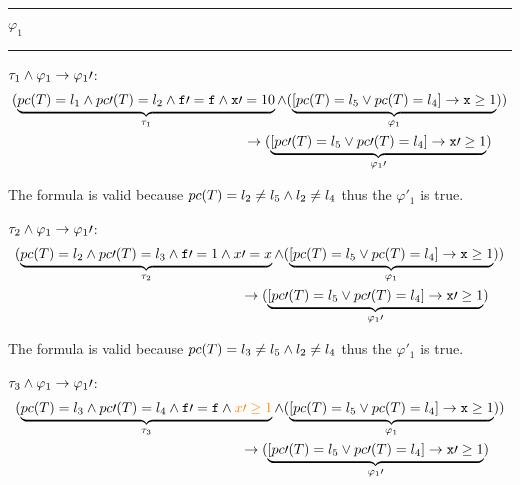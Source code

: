 \begin{center}\rule{4cm}{0.4pt}  $\varphi_1$  \rule{4cm}{0.4pt}\end{center}
	
	 $\tau_1 \wedge \varphi_1 \to \varphi_1\prime $:
	\begin{align*}
		(
			\underbrace{pc(T) = l_1 \wedge pc\prime (T) = l_2 \wedge \mathtt{f\prime =f} \wedge \mathtt{x}\prime  = 10}_{\tau_1} \wedge (\underbrace{[pc(T) = l_5 \vee pc(T) = l_4 ] \to \mathtt{x}\geq 1}_{\varphi_1})
		) \\
				\to(\underbrace{[pc\prime (T) = l_5 \vee pc\prime(T) = l_4] \to \mathtt{x}\prime  \geq 1}_{\varphi_1\prime })\;\;\;\;
	\end{align*}


	The formula is valid because $pc(T) = l_2 \neq l_5 \wedge l_2 \neq l_4$ thus the $\varphi\prime _1$ is true.

	 $\tau_2 \wedge \varphi_1 \to \varphi_1\prime $:
	\begin{align*}
		(
			\underbrace{pc(T) = l_2 \wedge pc\prime (T) = l_3 \wedge \mathtt{f}\prime  = 1 \wedge x\prime =x}_{\tau_2} \wedge (\underbrace{[pc(T) = l_5 \vee pc(T) = l_4 ] \to \mathtt{x}\geq 1}_{\varphi_1})
		) \\
			\to(\underbrace{[pc\prime (T) = l_5 \vee pc\prime(T) = l_4] \to \mathtt{x}\prime  \geq 1}_{\varphi_1\prime })\;\;\;\;
	\end{align*}


	The formula is valid because $pc(T) = l_3 \neq l_5 \wedge l_2 \neq l_4$ thus the $\varphi\prime _1$ is true.

	 $\tau_3 \wedge \varphi_1 \to \varphi_1\prime $:
	\begin{align*}
		(
			\underbrace{pc(T) = l_3 \wedge pc\prime (T) = l_4 \wedge \mathtt{f\prime =f} \wedge \textcolor{orange}{x\prime \geq 1}}_{\tau_3} \wedge (\underbrace{[pc(T) = l_5 \vee pc(T) = l_4 ] \to \mathtt{x}\geq 1}_{\varphi_1})
		) \\
			\to(\underbrace{[pc\prime (T) = l_5 \vee pc\prime(T) = l_4] \to \mathtt{x}\prime  \geq 1}_{\varphi_1\prime })\;\;\;\;
	\end{align*}


